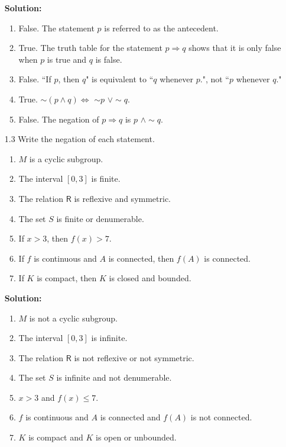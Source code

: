 \begin{enumerate}
      \textbf{Solution:} 

      \begin{enumerate}
         \item False. The statement $p$ is referred to as the antecedent.
         \item True. The truth table for the statement $p \Rightarrow q$ shows
               that it is only false when $p$ is true and $q$ is false.
         \item False. ``If $p$, then $q$" is equivalent to ``$q$ whenever $p$.",
               not ``$p$ whenever $q$."
         \item True. $\sim$$(p \land q) \Leftrightarrow$ $\sim$$p$
               $\lor \sim$$q$.
         \item False. The negation of $p \Rightarrow q$ is $p$ $\land \sim$$q$.
      \end{enumerate}

   \item[1.3] Write the negation of each statement.
      \begin{enumerate}
         \item $M$ is a cyclic subgroup.
         \item The interval $[0,3]$ is finite.
         \item The relation $\mathsf{R}$ is reflexive and symmetric.
         \item The set $S$ is finite or denumerable.
         \item If $x > 3$, then $f(x) > 7$.
         \item If $f$ is continuous and $A$ is connected, then $f(A)$ is
               connected.
         \item If $K$ is compact, then $K$ is closed and bounded.
      \end{enumerate}

      \textbf{Solution:}

      \begin{enumerate}
         \item $M$ is not a cyclic subgroup.
         \item The interval $[0,3]$ is infinite.
         \item The relation $\mathsf{R}$ is not reflexive or not symmetric.
         \item The set $S$ is infinite and not denumerable.
         \item $x > 3$ and $f(x) \le 7$.
         \item $f$ is continuous and $A$ is connected and $f(A)$ is not
               connected.
         \item $K$ is compact and $K$ is open or unbounded.
      \end{enumerate}


\end{enumerate}
